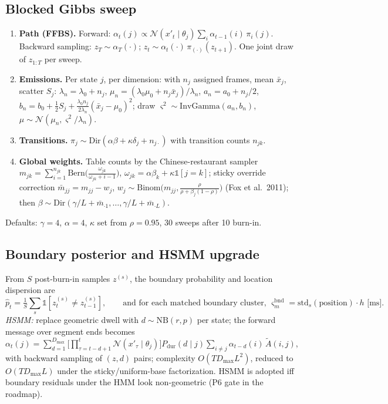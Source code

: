 \documentclass[10pt]{article}
\newcommand{\ind}[1]{\mathbb{1}\!\left[#1\right]}
\newcommand{\Dir}{\mathrm{Dir}}
\newcommand{\NB}{\mathrm{NB}}
\newcommand{\Norm}{\mathcal{N}}
\begin{document}
\subsection{Blocked Gibbs sweep}
\begin{enumerate}
\item \textbf{Path (FFBS).} Forward: $\alpha_t(j) \propto \Norm(x'_t \mid \theta_j) \sum_{i} \alpha_{t-1}(i)\, \pi_i(j)$. Backward sampling: $z_T \sim \alpha_T(\cdot)$; $z_t \sim \alpha_t(\cdot)\, \pi_{(\cdot)}(z_{t+1})$. One joint draw of $z_{1:T}$ per sweep.
\item \textbf{Emissions.} Per state $j$, per dimension: with $n_j$ assigned frames, mean $\bar x_j$, scatter $S_j$:
$\lambda_n = \lambda_0 + n_j$, $\mu_n = (\lambda_0\mu_0 + n_j\bar x_j)/\lambda_n$, $a_n = a_0 + n_j/2$, $b_n = b_0 + \tfrac12 S_j + \tfrac{\lambda_0 n_j}{2\lambda_n}(\bar x_j - \mu_0)^2$; draw $\varsigma^2 \sim \mathrm{InvGamma}(a_n, b_n)$, $\mu \sim \Norm(\mu_n, \varsigma^2/\lambda_n)$.
\item \textbf{Transitions.} $\pi_j \sim \Dir(\alpha\beta + \kappa\delta_j + n_{j\cdot})$ with transition counts $n_{jk}$.
\item \textbf{Global weights.} Table counts by the Chinese-restaurant sampler $m_{jk} = \sum_{i=1}^{n_{jk}} \mathrm{Bern}\!\big(\tfrac{\omega_{jk}}{\omega_{jk} + i - 1}\big)$, $\omega_{jk} = \alpha\beta_k + \kappa\ind{j{=}k}$; sticky override correction $\bar m_{jj} = m_{jj} - w_j$, $w_j \sim \mathrm{Binom}\!\big(m_{jj}, \tfrac{\rho}{\rho + \beta_j(1-\rho)}\big)$ (Fox et al.\ 2011); then $\beta \sim \Dir(\gamma/L + \bar m_{\cdot 1}, \dots, \gamma/L + \bar m_{\cdot L})$.
\end{enumerate}
Defaults: $\gamma = 4$, $\alpha = 4$, $\kappa$ set from $\rho = 0.95$, 30 sweeps after 10 burn-in.

\subsection{Boundary posterior and HSMM upgrade}
From $S$ post-burn-in samples $z^{(s)}$, the boundary probability and location dispersion are
\begin{equation}
\hat p_t = \tfrac{1}{S}\textstyle\sum_s \ind{z_t^{(s)} \ne z_{t-1}^{(s)}}, \qquad
\text{and for each matched boundary cluster, } \varsigma^{\mathrm{bnd}}_m = \mathrm{std}_s(\text{position}) \cdot h \text{ [ms]}.
\end{equation}
\emph{HSMM:} replace geometric dwell with $d \sim \NB(r, p)$ per state; the forward message over segment ends becomes
$\alpha_t(j) = \sum_{d=1}^{D_{\max}} \big[\prod_{\tau=t-d+1}^{t} \Norm(x'_\tau \mid \theta_j)\big] P_{\mathrm{dur}}(d \mid j) \sum_{i \ne j} \alpha_{t-d}(i)\, \tilde A(i,j)$,
with backward sampling of $(z, d)$ pairs; complexity $O(T D_{\max} L^2)$, reduced to $O(T D_{\max} L)$ under the sticky/uniform-base factorization. HSMM is adopted iff boundary residuals under the HMM look non-geometric (P6 gate in the roadmap).
\end{document}
